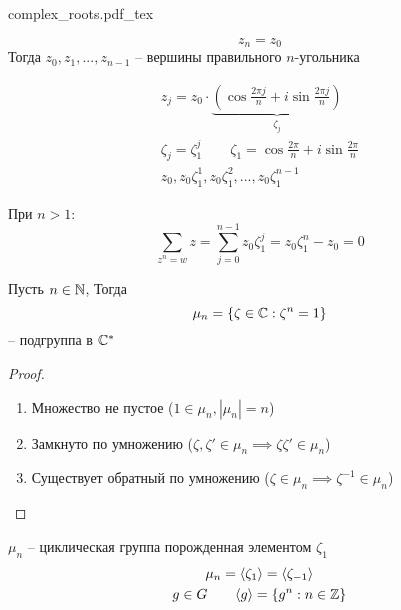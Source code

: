 \documentclass[main]{subfiles}
\begin{document}
\begin{minipage}{0.45\textwidth}
    {complex_roots.pdf_tex}
\end{minipage}
\begin{minipage}{0.45\textwidth}
    \[z_n = z_0\]
    Тогда $z_0, z_1, ..., z_{n-1}$ -- вершины правильного $n$-угольника
\end{minipage}

\begin{gather*}
    z_j = z_0 \cdot \underbrace{\left(\cos \frac{2 \pi j}{n}+ i \sin \frac{2 \pi j}{n}\right)}_{\zeta_j}\\
    \zeta_j = \zeta_1^j \qquad \zeta_1 = \cos \frac{2 \pi}{n}+ i \sin \frac{2 \pi}{n}\\
    z_0, z_0 \zeta_1^1,  z_0 \zeta_1^2, ..., z_0 \zeta_1^{n-1}
\end{gather*}

\begin{corollary}
    При $n>1$:
    \[\sum_{z^n=w} z= \sum_{j=0}^{n-1} z_0\zeta_1^j = z_0 \zeta_1^n - z_0 = 0\]
\end{corollary}

\begin{proposition}
    Пусть $n\in \mathbb{N}$, Тогда
    \[\mu_n = \{\zeta \in \mathbb{C}: \zeta^n =1\}\]
    -- подгруппа в $\mathbb{C}^*$
\end{proposition}
\begin{proof}
    \begin{enumerate}
        \item Множество не пустое ($1\in \mu_n, |\mu_n|=n$)
        \item Замкнуто по умножению ($\zeta, \zeta' \in \mu_n \implies \zeta \zeta'\in \mu_n$)
        \item Существует обратный по умножению ($\zeta \in \mu_n \implies \zeta^{-1} \in \mu_n$)
    \end{enumerate}
\end{proof}
\begin{remark}
    $\mu_n$ -- циклическая группа порожденная элементом $\zeta_1$
    \begin{gather*}
        \mu_n = \langle \zeta_1 \rangle = \langle \zeta_{-1} \rangle\\
        g \in G \qquad \langle g \rangle = \{g^n:n \in \mathbb{Z}\}
    \end{gather*}
\end{remark}
\end{document}
